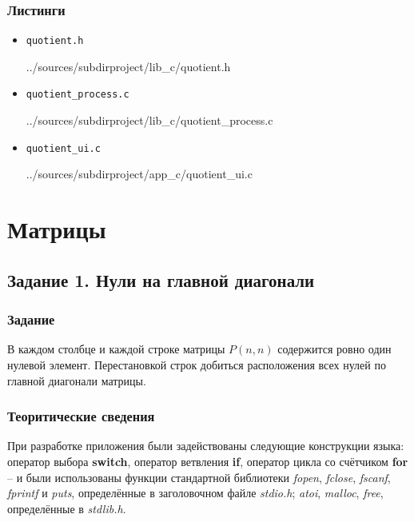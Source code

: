 \documentclass[12pt,a4paper]{report}
\begin{document}
\subsection*{Листинги}
\begin{itemize}
\item[] \verb-quotient.h-

{../sources/subdirproject/lib_c/quotient.h}
\item[] \verb-quotient_process.c-

{../sources/subdirproject/lib_c/quotient_process.c}
\item[] \verb-quotient_ui.c-

{../sources/subdirproject/app_c/quotient_ui.c}
\end{itemize}

%
\chapter{Матрицы}
\section{Задание 1. Нули на главной диагонали}
\subsection{Задание}
\hspace{\parindent}
В каждом столбце и каждой строке матрицы $P(n,n)$ содержится ровно один нулевой элемент. Перестановкой строк добиться расположения всех нулей по главной диагонали матрицы.
\subsection{Теоритические сведения}
\hspace{\parindent}
При разработке приложения были задействованы следующие конструкции языка: оператор выбора \textbf{switch}, оператор ветвления \textbf{if}, оператор цикла со счётчиком \textbf{for} -- и были использованы функции стандартной библиотеки \textit{fopen}, \textit{fclose}, \textit{fscanf}, \textit{fprintf} и \textit{puts}, определённые в заголовочном файле \textit{stdio.h}; \textit{atoi}, \textit{malloc}, \textit{free}, определённые в \textit{stdlib.h}.
\end{document}
